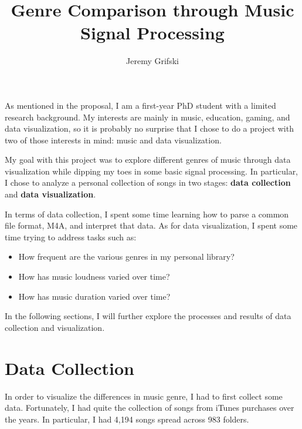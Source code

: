 \documentclass[journal]{vgtc}                %
\title{Genre Comparison through Music Signal Processing}
\author{Jeremy Grifski}
\begin{document}


\maketitle

As mentioned in the proposal, I am a first-year PhD student with a limited
research background. My interests are mainly in music, education, gaming, and
data visualization, so it is probably no surprise that I chose to do a project
with two of those interests in mind: music and data visualization.

My goal with this project was to explore different genres of music through
data visualization while dipping my toes in some basic signal processing.
In particular, I chose to analyze a personal collection of songs in two
stages: \textbf{data collection} and \textbf{data visualization}.

In terms of data collection, I spent some time learning how to parse a common
file format, M4A, and interpret that data. As for data visualization, I spent
some time trying to address tasks such as:

\begin{itemize}
  \item How frequent are the various genres in my personal library?
  \item How has music loudness varied over time?
  \item How has music duration varied over time?
\end{itemize}

In the following sections, I will further explore the processes and results of
data collection and visualization.

\section{Data Collection}

In order to visualize the differences in music genre, I had to first collect
some data. Fortunately, I had quite the collection of songs from iTunes purchases
over the years. In particular, I had 4,194 songs spread across 983 folders.
\end{document}
